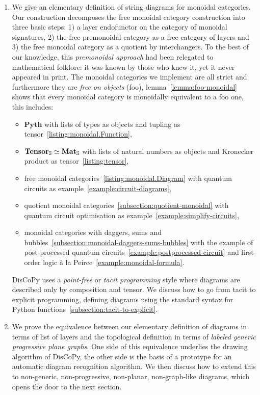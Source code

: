 \begin{enumerate}
\item We give an elementary definition of string diagrams for monoidal categories.
Our construction decomposes the free monoidal category construction into three basic steps: 1) a layer endofunctor on the category of monoidal signatures, 2) the free premonoidal category as a free category of layers and 3) the free monoidal category as a quotient by interchangers.
To the best of our knowledge, this \emph{premonoidal approach} had been relegated to mathematical folklore: it was known by those who knew it, yet it never appeared in print.
The monoidal categories we implement are all strict and furthermore they are \emph{free on objects} (foo), lemma~\ref{lemma:foo-monoidal} shows that every monoidal category is monoidally equivalent to a foo one, this includes:
\begin{itemize}
    \item $\mathbf{Pyth}$ with lists of types as objects and tupling as tensor~\ref{listing:monoidal.Function},
    \item $\mathbf{Tensor}_\S \simeq \mathbf{Mat}_\S$ with lists of natural numbers as objects and Kronecker product as tensor~\ref{listing:tensor},
    \item free monoidal categories~\ref{listing:monoidal.Diagram} with quantum circuits as example~\ref{example:circuit-diagrams},
    \item quotient monoidal categories~\ref{subsection:quotient-monoidal} with quantum circuit optimisation as example~\ref{example:simplify-circuits},
    \item monoidal categories with daggers, sums and bubbles~\ref{subsection:monoidal-daggers-sums-bubbles} with the example of post-processed quantum circuits~\ref{example:postprocessed-circuit} and first-order logic à la Peirce~\ref{example:monoidal-formula}.
\end{itemize}
DisCoPy uses a \emph{point-free} or \emph{tacit programming} style where diagrams are described only by composition and tensor.
We discuss how to go from tacit to explicit programming, defining diagrams using the standard syntax for Python functions~\ref{subsection:tacit-to-explicit}.

\item We prove the equivalence between our elementary definition of diagrams in terms of list of layers and the topological definition in terms of \emph{labeled generic progressive plane graphs}.
One side of this equivalence underlies the drawing algorithm of DisCoPy, the other side is the basis of a prototype for an automatic diagram recognition algorithm.
We then discuss how to extend this to non-generic, non-progressive, non-planar, non-graph-like diagrams, which opens the door to the next section.


\end{enumerate}
